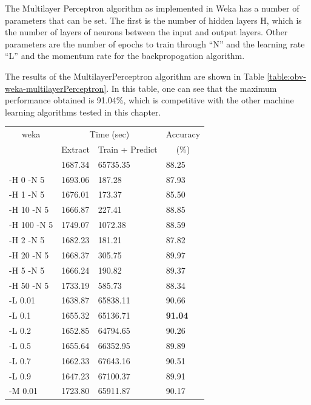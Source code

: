 \documentclass[12pt,oneside]{book}
\begin{document}
The Multilayer Perceptron algorithm as implemented in Weka has a
number of parameters that can be set.  The first is the number of
hidden layers H, which is the number of layers of neurons between the
input and output layers.  Other parameters are the number of epochs to train
through ``N'' and the learning rate ``L'' and the momentum rate for
the backpropogation algorithm.

The results of the MultilayerPerceptron algorithm are shown in Table
\ref{table:obv-weka-multilayerPerceptron}. In this table, one can see
that the maximum performance obtained is 91.04\%, which is competitive
with the other machine learning algorithms tested in this chapter.

\begin{table}
\begin{tabular}{|l|l|l|l|}
\hline
\multicolumn{1}{|c|}{weka} & \multicolumn{2}{c|}{Time (sec)} & Accuracy \\
\hhline{|~|-|-|~|}
\multicolumn{1}{|c|}{param} & Extract & Train + Predict & \multicolumn{1}{c|}{(\%)} \\
\hhline{|=|=|=|=|}
              &  1687.34  &     65735.35  &  88.25  \\
 -H 0 -N 5    &  1693.06  &       187.28  &  87.93  \\
 -H 1 -N 5    &  1676.01  &       173.37  &  85.50  \\
 -H 10 -N 5   &  1666.87  &       227.41  &  88.85  \\
 -H 100 -N 5  &  1749.07  &      1072.38  &  88.59  \\
 -H 2 -N 5    &  1682.23  &       181.21  &  87.82  \\
 -H 20 -N 5   &  1668.37  &       305.75  &  89.97  \\
 -H 5 -N 5    &  1666.24  &       190.82  &  89.37  \\
 -H 50 -N 5   &  1733.19  &       585.73  &  88.34  \\
\hline
 -L 0.01      &  1638.87  &     65838.11  &  90.66  \\
 -L 0.1       &  1655.32  &     65136.71  &  \textbf{91.04}  \\
 -L 0.2       &  1652.85  &     64794.65  &  90.26  \\
 -L 0.5       &  1655.64  &     66352.95  &  89.89  \\
 -L 0.7       &  1662.33  &     67643.16  &  90.51  \\
 -L 0.9       &  1647.23  &     67100.37  &  89.91  \\
\hline
 -M 0.01      &  1723.80  &     65911.87  &  90.17  \\

\end{tabular}
\end{table}
\end{document}
